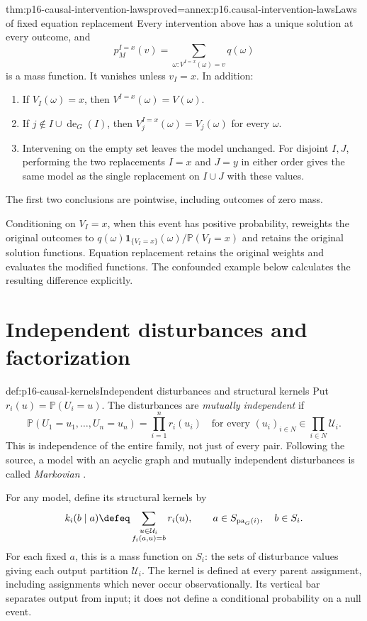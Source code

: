 \begin{hbtheorem}{thm:p16-causal-intervention-laws}{proved=annex:p16.causal-intervention-laws}{Laws of fixed equation replacement}
Every intervention above has a unique solution at every outcome, and
\[
 p_M^{I=x}(v)=\sum_{\omega:V^{I=x}(\omega)=v}q(\omega)
\]
is a mass function. It vanishes unless \(v_I=x\). In addition:
\begin{enumerate}
\item If \(V_I(\omega)=x\), then
      \(V^{I=x}(\omega)=V(\omega)\).
\item If \(j\notin I\cup\operatorname{de}_G(I)\), then
      \(V_j^{I=x}(\omega)=V_j(\omega)\) for every \(\omega\).
\item Intervening on the empty set leaves the model unchanged.
      For disjoint \(I,J\), performing the two replacements
      \(I=x\) and \(J=y\) in either order gives the same model
      as the single replacement on \(I\cup J\) with these values.
\end{enumerate}
The first two conclusions are pointwise, including outcomes of zero mass.
\end{hbtheorem}

Conditioning on \(V_I=x\), when this event has positive probability,
reweights the original outcomes to
\(q(\omega)\mathbf1_{\{V_I=x\}}(\omega)/\mathbb P(V_I=x)\)
and retains the original solution functions. Equation replacement retains
the original weights and evaluates the modified functions. The confounded
example below calculates the resulting difference explicitly.

\section{Independent disturbances and factorization}
\label{sec:p16-causal-factorization}

\begin{hbdefinition}{def:p16-causal-kernels}{Independent disturbances and structural kernels}
Put \(r_i(u)=\mathbb P(U_i=u)\). The disturbances are
\emph{mutually independent} if
\[
 \mathbb P(U_1=u_1,\ldots,U_n=u_n)=\prod_{i=1}^n r_i(u_i)
 \quad\text{for every }(u_i)_{i\in N}\in\prod_{i\in N}\mathcal U_i.
\]
This is independence of the entire family, not just of every pair.
Following the source, a model with an acyclic graph and mutually
independent disturbances is called \emph{Markovian}
\cite[sec.~3.2.3, p.~110]{Pearl2009CausalOverview}.

For any model, define its structural kernels by
\[
 k_i(b\mid a)\defeq
 \sum_{\substack{u\in\mathcal U_i\\f_i(a,u)=b}}r_i(u),
 \qquad a\in S_{\operatorname{pa}_G(i)},\quad b\in S_i.
\]
For each fixed \(a\), this is a mass function on \(S_i\): the sets
of disturbance values giving each output partition \(\mathcal U_i\).
The kernel is defined at every parent assignment, including assignments
which never occur observationally. Its vertical bar separates output from
input; it does not define a conditional probability on a null event.
\end{hbdefinition}

